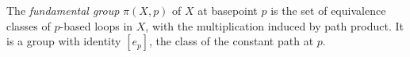The \textit{fundamental group} $\pi(X,p)$ of $X$ at basepoint $p$ is the set of equivalence classes of $p$-based loops in $X$, with the multiplication induced by path product. It is a group with identity $[e_p]$, the class of the constant path at $p$.
